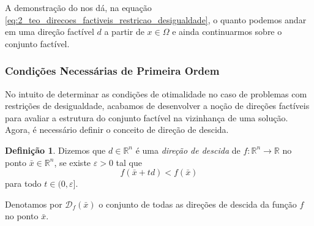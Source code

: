 \documentclass[12pt,a4paper]{scrartcl}
\def\RR{\mathds{R}}
\def\xbar{\bar{x}}
\theoremstyle{definition}%
\newtheorem{defi}{Definição}
\begin{document}
A demonstração do  nos dá, na equação \eqref{eq:2_teo_direcoes_factiveis_restricao_desigualdade}, o quanto podemos andar em uma direção factível $d$ a partir de $x \in \Omega$ e ainda continuarmos sobre o conjunto factível.


\subsubsection{Condições Necessárias de Primeira Ordem}

No intuito de determinar as condições de otimalidade no caso de problemas com restrições de desigualdade, acabamos de desenvolver a noção de direções factíveis para avaliar a estrutura do conjunto factível na vizinhança de uma solução. Agora, é necessário definir o conceito de direção de descida.

\begin{defi} \label{defi:direcao_de_descida}
Dizemos que $d\in \RR^{n}$ é uma \emph{direção de descida} de $f:\RR^{n} \rightarrow \RR$ no ponto $\xbar \in \RR^{n}$, se existe $\varepsilon >0$ tal que
\[
f(\xbar + td) <f(\xbar)
\]
para todo $t \in (0,\varepsilon ]$.
\end{defi}
Denotamos por $\mathcal{D}_{f}(\xbar)$ o conjunto de todas as direções de descida da função $f$ no ponto $\xbar$.
\end{document}
